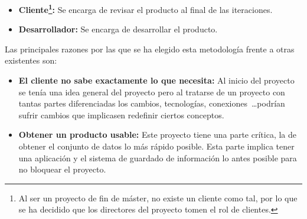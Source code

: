 \begin{itemize}[noitemsep]
    \item \textbf{Cliente\footnote{Al ser un proyecto de fin de máster, no existe un cliente como tal, por lo que se ha decidido que los directores del proyecto tomen el rol de clientes.}:} Se encarga de revisar el producto al final de las iteraciones.
    \item \textbf{Desarrollador:} Se encarga de desarrollar el producto.
\end{itemize}


Las principales razones por las que se ha elegido esta metodología frente a otras existentes son:

\begin{itemize}[noitemsep]
    \item \textbf{El cliente no sabe exactamente lo que necesita:} Al inicio del proyecto se tenía una idea general del proyecto pero al tratarse de un proyecto con tantas partes diferenciadas los cambios, tecnologías, conexiones~\dots podrían sufrir cambios que implicasen redefinir ciertos conceptos.

    \item \textbf{Obtener un producto usable:} Este proyecto tiene una parte crítica, la de obtener el conjunto de datos lo más rápido posible. Esta parte implica tener una aplicación y el sistema de guardado de información lo antes posible para no bloquear el proyecto.
\end{itemize}
